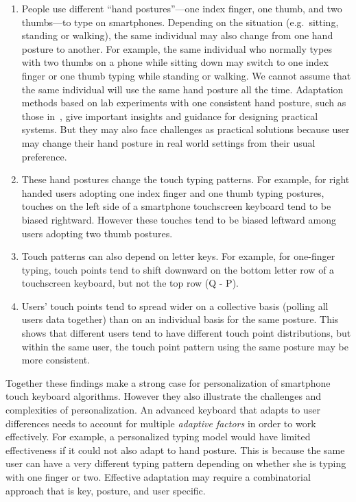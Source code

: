 \documentclass{sigchi}
\begin{document}
\begin{enumerate}
\item People use different ``hand postures''---one index finger, one thumb, and two thumbs---to type on smartphones. Depending on the situation (e.g.\ sitting, standing or walking), the same individual may also change from one hand posture to another. For example, the same individual who normally types with two thumbs on a phone while sitting down may switch to one index finger or one thumb typing while standing or walking. We cannot assume that the same individual will use the same hand posture all the time. Adaptation methods based on lab experiments with one consistent hand  posture, such as those in~\cite{Findlater:2012}, give important insights and guidance for designing practical systems. But they may also face challenges as practical solutions because user may change their hand posture in real world settings from their usual preference.

\item These hand postures change the touch typing patterns. For example, for right handed users adopting one index finger and one thumb typing postures, touches on the left side of a smartphone touchscreen keyboard tend to be biased rightward. However these touches tend to be biased leftward among users adopting two thumb postures.

\item Touch patterns can also depend on letter keys. For example, for one-finger typing, touch points tend to shift downward on the bottom letter row of a touchscreen keyboard, but not the top row (Q - P).

\item Users’ touch points tend to spread wider on a collective basis (polling all users data together) than on an individual basis for the same posture. This shows that different users tend to have different touch point distributions, but within the same user, the touch point pattern using the same posture may be more consistent.
\end{enumerate}

Together these findings make a strong case for personalization of smartphone touch keyboard algorithms. However they also illustrate the challenges and complexities of personalization. An advanced keyboard that adapts to user differences needs to account for multiple \textit{adaptive factors} in order to work effectively. For example, a personalized typing model would have limited effectiveness if it could not also adapt to hand posture. This is because the same user can have a very different typing pattern depending on whether she is typing with one finger or two. Effective adaptation may require a combinatorial approach that is key, posture, and user specific.
\end{document}
